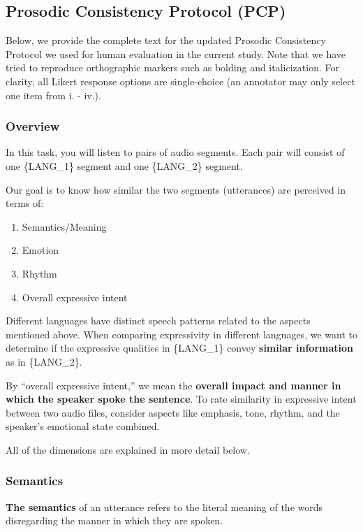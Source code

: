 \FloatBarrier
\subsection{Prosodic Consistency Protocol (PCP)}
\label{sec:PCP_protocol_text}

Below, we provide the complete text for the updated Prosodic Consistency Protocol we used for human evaluation in the current study. Note that we have tried to reproduce orthographic markers such as bolding and italicization. For clarity, all Likert response options are single-choice (an annotator may only select one item from i. - iv.).

\subsubsection{Overview}
In this task, you will listen to pairs of audio segments. Each pair will consist of one \{LANG\_1\} segment and one \{LANG\_2\} segment. 

Our goal is to know how similar the two segments (utterances) are perceived in terms of:

\begin{enumerate}
    \item Semantics/Meaning
    \item Emotion
    \item Rhythm
    \item Overall expressive intent
\end{enumerate}

Different languages have distinct speech patterns related to the aspects mentioned above. When comparing expressivity in different languages, we want to determine if the expressive qualities in \{LANG\_1\} convey \textbf{similar information} as in \{LANG\_2\}.

By “overall expressive intent,” we mean the \textbf{overall impact and manner in which the speaker spoke the sentence}. To rate similarity in expressive intent between two audio files, consider aspects like emphasis, tone, rhythm, and the speaker's emotional state combined.

All of the dimensions are explained in more detail below.

\subsubsection{Semantics}
\textbf{The semantics} of an utterance refers to the literal meaning of the words disregarding the manner in which they are spoken. 

